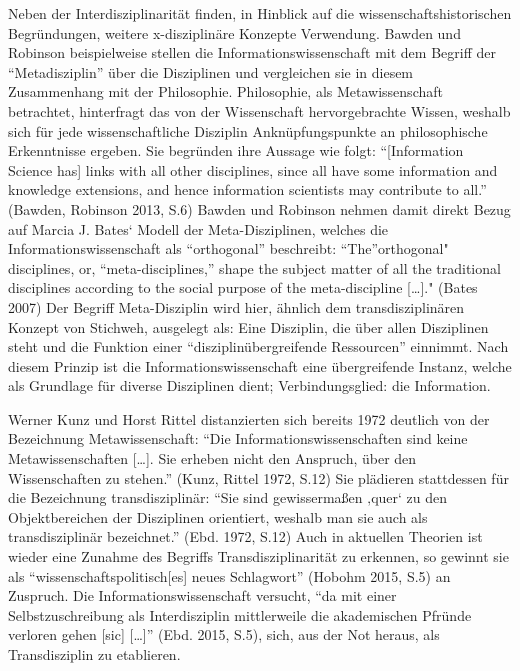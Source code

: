 \documentclass[a4paper,
fontsize=11pt,
oneside,
numbers=noperiodatend,
parskip=half-,
bibliography=totoc,
final
]{scrartcl}
\begin{document}
Neben der Interdisziplinarität finden, in Hinblick auf die
wissenschaftshistorischen Begründungen, weitere x-disziplinäre Konzepte
Verwendung. Bawden und Robinson beispielweise stellen die
Informationswissenschaft mit dem Begriff der \enquote{Metadisziplin}
über die Disziplinen und vergleichen sie in diesem Zusammenhang mit der
Philosophie. Philosophie, als Metawissenschaft betrachtet, hinterfragt
das von der Wissenschaft hervorgebrachte Wissen, weshalb sich für jede
wissenschaftliche Disziplin Anknüpfungspunkte an philosophische
Erkenntnisse ergeben. Sie begründen ihre Aussage wie folgt:
\enquote{{[}Information Science has{]} links with all other disciplines,
since all have some information and knowledge extensions, and hence
information scientists may contribute to all.} (Bawden, Robinson 2013,
S.6) Bawden und Robinson nehmen damit direkt Bezug auf Marcia J. Bates`
Modell der Meta-Disziplinen, welches die Informationswissenschaft als
\enquote{orthogonal} beschreibt: \enquote{The}orthogonal" disciplines,
or, \enquote{meta-disciplines,} shape the subject matter of all the
traditional disciplines according to the social purpose of the
meta-discipline {[}\ldots{}{]}." (Bates 2007) Der Begriff Meta-Disziplin
wird hier, ähnlich dem transdisziplinären Konzept von Stichweh,
ausgelegt als: Eine Disziplin, die über allen Disziplinen steht und die
Funktion einer \enquote{disziplinübergreifende Ressourcen} einnimmt.
Nach diesem Prinzip ist die Informationswissenschaft eine übergreifende
Instanz, welche als Grundlage für diverse Disziplinen dient;
Verbindungsglied: die Information.

Werner Kunz und Horst Rittel distanzierten sich bereits 1972 deutlich
von der Bezeichnung Metawissenschaft: \enquote{Die
Informationswissenschaften sind keine Metawissenschaften {[}\ldots{}{]}.
Sie erheben nicht den Anspruch, über den Wissenschaften zu stehen.}
(Kunz, Rittel 1972, S.12) Sie plädieren stattdessen für die Bezeichnung
transdisziplinär: \enquote{Sie sind gewissermaßen ‚quer` zu den
Objektbereichen der Disziplinen orientiert, weshalb man sie auch als
transdisziplinär bezeichnet.} (Ebd. 1972, S.12) Auch in aktuellen
Theorien ist wieder eine Zunahme des Begriffs Transdisziplinarität zu
erkennen, so gewinnt sie als \enquote{wissenschaftspolitisch{[}es{]}
neues Schlagwort} (Hobohm 2015, S.5) an Zuspruch. Die
Informationswissenschaft versucht, \enquote{da mit einer
Selbstzuschreibung als Interdisziplin mittlerweile die akademischen
Pfründe verloren gehen {[}sic{]} {[}\ldots{}{]}} (Ebd. 2015, S.5), sich,
aus der Not heraus, als Transdisziplin zu etablieren.
\end{document}
